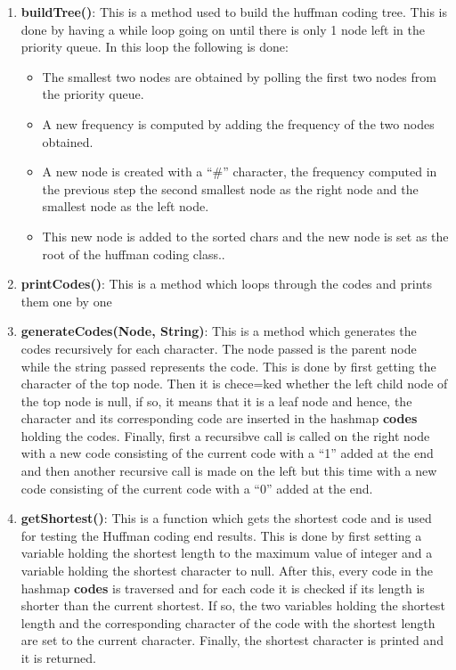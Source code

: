 \documentclass{article}
\newcommand{\quotes}[1]{``#1''}
\begin{document}
		\begin{enumerate}
		\item \textbf{buildTree()}: This is a method used to build the huffman coding tree. This is done by having a while loop going on until there is only 1 node left in the priority queue. In this loop the following is done:
		\begin{itemize}
			\item The smallest two nodes are obtained by polling the first two nodes from the priority queue. 
			\item A new frequency is computed by adding the frequency of the two nodes obtained.
			\item A new node is created with a \quotes{\#} character, the frequency computed in the previous step the second smallest node as the right node and the smallest node as the left node.
			\item This new node is added to the sorted chars and the new node is set as the root of the huffman coding class..
		\end{itemize}
		
		\item \textbf{printCodes()}: This is a method which loops through the codes and prints them one by one
		\item \textbf{generateCodes(Node, String)}: This is a method which generates the codes recursively for each character. The node passed is the parent node while the string passed represents the code. This is done by first getting the character of the top node. Then it is chece=ked whether the left child node of the top node is null, if so, it means that it is a leaf node and hence, the character and its corresponding code are inserted in the hashmap \textbf{codes} holding the codes. Finally, first a recursibve call is called on the right node with a new code consisting of the current code with a \quotes{1} added at the end and then another recursive call is made on the left but this time with a new code consisting of the current code with a \quotes{0} added at the end.
		\item \textbf{getShortest()}: This is a function which gets the shortest code and is used for testing the Huffman coding end results. This is done by first setting a variable holding the shortest length to the maximum value of integer and a variable holding the shortest character to null. After this, every code in the hashmap \textbf{codes} is traversed and for each code it is checked if its length is shorter than the current shortest. If so, the two variables holding the shortest length and the corresponding character of the code with the shortest length are set to the current character. Finally, the shortest character is printed and it is returned.
		

\end{enumerate}
\end{document}
